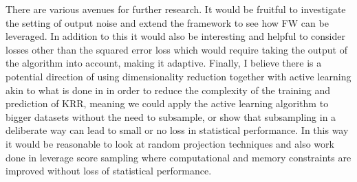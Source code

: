 There are various avenues for further research. It would be fruitful to
investigate the setting of output noise and extend the framework to see how FW
can be leveraged. In addition to this it would also be interesting and helpful to
consider losses other than the squared error loss which would require taking the
output of the algorithm into account, making it adaptive. Finally, I believe
there is a potential direction of using dimensionality reduction together with
active learning akin to what is done in \citep{rudi18} in order to reduce the
complexity of the training and prediction of KRR, meaning we could apply the
active learning algorithm to bigger datasets without the need to subsample, or
show that subsampling in a deliberate way can lead to small or no loss in statistical
performance. In this way it would be reasonable to look at random projection
techniques and also work done in leverage score sampling where computational and
memory constraints are improved without loss of statistical performance.

